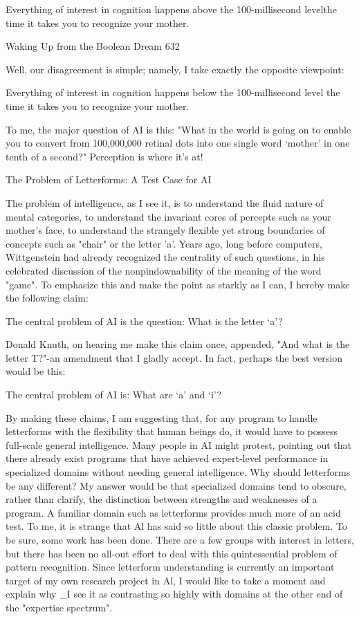        Everything of interest in cognition happens above the 100-millisecond levelthe
       time it takes you to recognize your mother.




Waking Up from the Boolean Dream                                                       632

Well, our disagreement is simple; namely, I take exactly the opposite viewpoint:

   Everything of interest in cognition happens below the 100-millisecond level the
   time it takes you to recognize your mother.

To me, the major question of AI is this: "What in the world is going on to enable you
to convert from 100,000,000 retinal dots into one single word `mother' in one tenth of
a second?" Perception is where it's at!

                 The Problem of Letterforms: A Test Case for AI

The problem of intelligence, as I see it, is to understand the fluid nature of mental
categories, to understand the invariant cores of percepts such as your mother's face, to
understand the strangely flexible yet strong boundaries of concepts such as "chair" or
the letter 'a'. Years ago, long before computers, Wittgenstein had already recognized
the centrality of such questions, in his celebrated discussion of the nonpindownability
of the meaning of the word "game". To emphasize this and make the point as starkly
as I can, I hereby make the following claim:

           The central problem of AI is the question: What is the letter `a'?

Donald Knuth, on hearing me make this claim once, appended, "And what is the letter
T?"-an amendment that I gladly accept. In fact, perhaps the best version would be
this:

                  The central problem of AI is: What are `a' and `i'?

By making these claims, I am suggesting that, for any program to handle letterforms
with the flexibility that human beings do, it would have to possess full-scale general
intelligence.
        Many people in AI might protest, pointing out that there already exist
programs that have achieved expert-level performance in specialized domains without
needing general intelligence. Why should letterforms be any different? My answer
would be that specialized domains tend to obscure, rather than clarify, the distinction
between strengths and weaknesses of a program. A familiar domain such as
letterforms provides much more of an acid test.
        To me, it is strange that Al has said so little about this classic problem. To be
sure, some work has been done. There are a few groups with interest in letters, but
there has been no all-out effort to deal with this quintessential problem of pattern
recognition. Since letterform understanding is currently an important target of my
own research project in Al, I would like to take a moment and explain why \_I see it as
contrasting so highly with domains at the other end of the "expertise spectrum".




